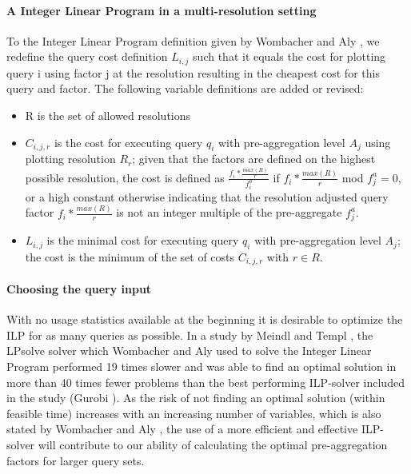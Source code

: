 \paragraph{A Integer Linear Program in a multi-resolution setting}
To the Integer Linear Program definition given by Wombacher and Aly \cite{wombacher2011}, we redefine the query cost definition $L_{i,j}$ such that it equals the cost for plotting query i using factor j at the resolution resulting in the cheapest cost for this query and factor. The following variable definitions are added or revised:
\begin{itemize}
\item R is the set of allowed resolutions
\item $C_{i,j,r}$ is the cost for executing query $q_{i}$ with pre-aggregation level $A_{j}$ using plotting resolution $R_{r}$; given that the factors are defined on the highest possible resolution, the cost is defined as $\frac{f_{i}*\frac{max(R)}{r}}{f_{i}^a}$ if $f_{i}*\frac{max(R)}{r}$ mod $f_{j}^a = 0$, or a high constant otherwise indicating that the resolution adjusted query factor $f_{i}*\frac{max(R)}{r}$ is not an integer multiple of the pre-aggregate $f_{j}^a$.
\item $L_{i,j}$ is the minimal cost for executing query $q_{i}$ with pre-aggregation level $A_{j}$; the cost is the minimum of the set of costs $C_{i,j,r}$ with $r \in R$.
\end{itemize}

\paragraph{Choosing the query input}
With no usage statistics available at the beginning it is desirable to optimize the ILP for as many queries as possible. In a study by Meindl and Templ \cite{meindl2012}, the LPsolve solver which Wombacher and Aly \cite{wombacher2011} used to solve the Integer Linear Program performed 19 times slower and was able to find an optimal solution in more than 40 times fewer problems than the best performing ILP-solver included in the study (Gurobi \cite{gurobi}). As the risk of not finding an optimal solution (within feasible time) increases with an increasing number of variables, which is also stated by Wombacher and Aly \cite{wombacher2011}, the use of a more efficient and effective ILP-solver will contribute to our ability of calculating the optimal pre-aggregation factors for larger query sets.\\

